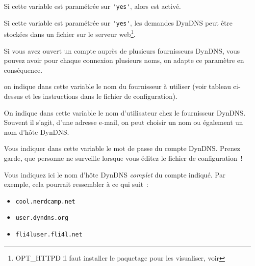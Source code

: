 \begin{description}


    {Si cette variable est paramétrée sur \verb*?'yes'?, alors  est activé.}


    {Si cette variable est paramétrée sur \verb*?'yes'?, les demandes DynDNS
    peut être stockées dans un fichier sur le serveur web\footnote{OPT\_HTTPD il
    faut installer le paquetage  pour les visualiser, voir
    }.}


    {Si vous avez ouvert un compte auprès de plusieurs fournisseurs DynDNS,
    vous pouvez avoir pour chaque connexion plusieurs noms, on adapte ce
    paramètre en conséquence.}


    {on indique dans cette variable le nom du fournisseur à utiliser (voir
    tableau ci-dessus et les instructions dans le fichier de configuration).}


    {On indique dans cette variable le nom d'utilisateur chez le fournisseur
    DynDNS. Souvent il s'agit, d'une adresse e-mail, on peut choisir un nom ou
    également un nom d'hôte DynDNS.}


    {Vous indiquer dans cette variable le mot de passe du compte DynDNS. Prenez
    garde, que personne ne surveille lorsque vous éditez le fichier de
    configuration~!}


    {Vous indiquez ici le nom d'hôte DynDNS \emph{complet} du compte indiqué.
    Par exemple, cela pourrait ressembler à ce qui suit~:

  \begin{itemize}
    \item \texttt{cool.nerdcamp.net}
    \item \texttt{user.dyndns.org}
    \item \texttt{fli4luser.fli4l.net}
  \end{itemize}
  }


\end{description}
